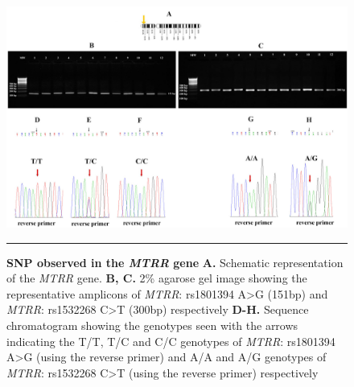 \begin{refsection}
\begin{figure}
\centering
\includegraphics[scale=0.9,keepaspectratio]{Figures/Figure6_3.pdf}
\rule{35em}{0.5pt}
\caption{\textbf{SNP observed in the \textit{MTRR} gene}
\textbf{A.} Schematic representation of the \textit{MTRR} gene. \textbf{B, C.} 2\% agarose gel image showing the representative amplicons of \textit{MTRR}: rs1801394 A>G (151bp) and \textit{MTRR}:  rs1532268 C>T (300bp) respectively \textbf{D-H.} Sequence chromatogram showing the genotypes seen with the arrows indicating the T/T, T/C and C/C genotypes of \textit{MTRR}: rs1801394 A>G (using the reverse primer) and A/A and A/G genotypes of \textit{MTRR}: rs1532268 C>T (using the reverse primer) respectively}
\label{fig:6_3}
\end{figure}



\end{refsection}
